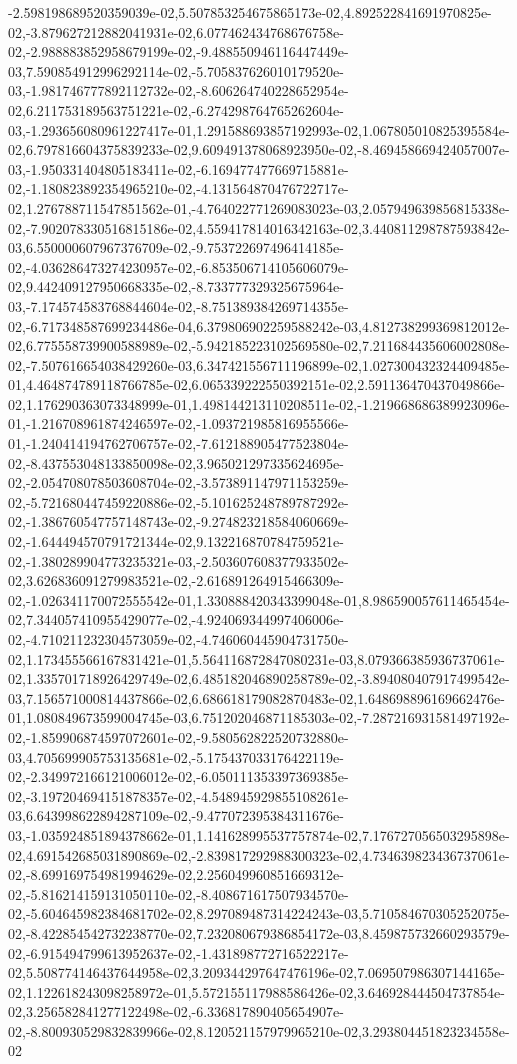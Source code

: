 -2.598198689520359039e-02,5.507853254675865173e-02,4.892522841691970825e-02,-3.879627212882041931e-02,6.077462434768676758e-02,-2.988883852958679199e-02,-9.488550946116447449e-03,7.590854912996292114e-02,-5.705837626010179520e-03,-1.981746777892112732e-02,-8.606264740228652954e-02,6.211753189563751221e-02,-6.274298764765262604e-03,-1.293656080961227417e-01,1.291588693857192993e-02,1.067805010825395584e-02,6.797816604375839233e-02,9.609491378068923950e-02,-8.469458669424057007e-03,-1.950331404805183411e-02,-6.169477477669715881e-02,-1.180823892354965210e-02,-4.131564870476722717e-02,1.276788711547851562e-01,-4.764022771269083023e-03,2.057949639856815338e-02,-7.902078330516815186e-02,4.559417814016342163e-02,3.440811298787593842e-03,6.550000607967376709e-02,-9.753722697496414185e-02,-4.036286473274230957e-02,-6.853506714105606079e-02,9.442409127950668335e-02,-8.733777329325675964e-03,-7.174574583768844604e-02,-8.751389384269714355e-02,-6.717348587699234486e-04,6.379806902259588242e-03,4.812738299369812012e-02,6.775558739900588989e-02,-5.942185223102569580e-02,7.211684435606002808e-02,-7.507616654038429260e-03,6.347421556711196899e-02,1.027300432324409485e-01,4.464874789118766785e-02,6.065339222550392151e-02,2.591136470437049866e-02,1.176290363073348999e-01,1.498144213110208511e-02,-1.219668686389923096e-01,-1.216708961874246597e-02,-1.093721985816955566e-01,-1.240414194762706757e-02,-7.612188905477523804e-02,-8.437553048133850098e-02,3.965021297335624695e-02,-2.054708078503608704e-02,-3.573891147971153259e-02,-5.721680447459220886e-02,-5.101625248789787292e-02,-1.386760547757148743e-02,-9.274823218584060669e-02,-1.644494570791721344e-02,9.132216870784759521e-02,-1.380289904773235321e-03,-2.503607608377933502e-02,3.626836091279983521e-02,-2.616891264915466309e-02,-1.026341170072555542e-01,1.330888420343399048e-01,8.986590057611465454e-02,7.344057410955429077e-02,-4.924069344997406006e-02,-4.710211232304573059e-02,-4.746060445904731750e-02,1.173455566167831421e-01,5.564116872847080231e-03,8.079366385936737061e-02,1.335701718926429749e-02,6.485182046890258789e-02,-3.894080407917499542e-03,7.156571000814437866e-02,6.686618179082870483e-02,1.648698896169662476e-01,1.080849673599004745e-03,6.751202046871185303e-02,-7.287216931581497192e-02,-1.859906874597072601e-02,-9.580562822520732880e-03,4.705699905753135681e-02,-5.175437033176422119e-02,-2.349972166121006012e-02,-6.050111353397369385e-02,-3.197204694151878357e-02,-4.548945929855108261e-03,6.643998622894287109e-02,-9.477072395384311676e-03,-1.035924851894378662e-01,1.141628995537757874e-02,7.176727056503295898e-02,4.691542685031890869e-02,-2.839817292988300323e-02,4.734639823436737061e-02,-8.699169754981994629e-02,2.256049960851669312e-02,-5.816214159131050110e-02,-8.408671617507934570e-02,-5.604645982384681702e-02,8.297089487314224243e-03,5.710584670305252075e-02,-8.422854542732238770e-02,7.232080679386854172e-03,8.459875732660293579e-02,-6.915494799613952637e-02,-1.431898772716522217e-02,5.508774146437644958e-02,3.209344297647476196e-02,7.069507986307144165e-02,1.122618243098258972e-01,5.572155117988586426e-02,3.646928444504737854e-02,3.256582841277122498e-02,-6.336817890405654907e-02,-8.800930529832839966e-02,8.120521157979965210e-02,3.293804451823234558e-02
